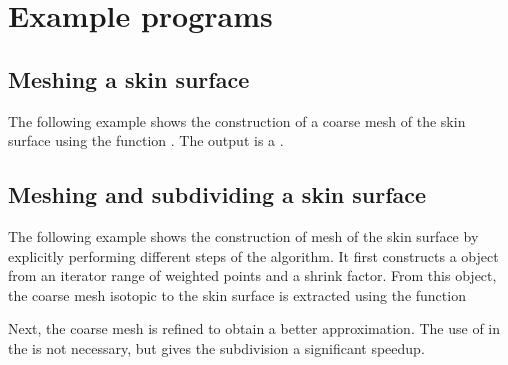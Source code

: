 \section{Example programs}
\subsection{Meshing a skin surface}
The following example shows the construction of a coarse mesh of the
skin surface using the function . The
output is a .

\subsection{Meshing and subdividing a skin surface}
The following example shows the construction of mesh of the skin
surface by explicitly performing different steps of the algorithm. It
first constructs a  object from an iterator range
of weighted points and a shrink factor. From this object, the coarse
mesh isotopic to the skin surface is extracted using the function

Next, the coarse mesh is refined to obtain a better approximation. The
use of  in
the  is not necessary, but gives the subdivision
a significant speedup.



